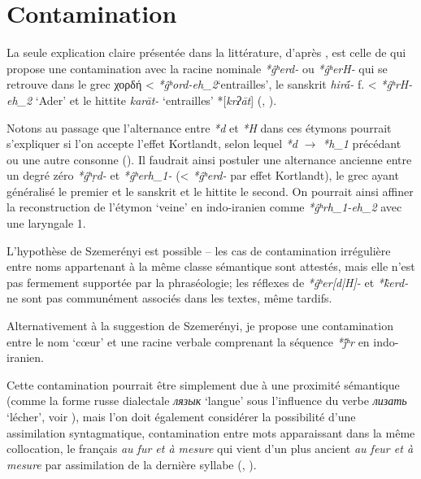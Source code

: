 \documentclass{article}
\newcommand{\ipa}[1]{{\phon\textit{#1}}}
\newcommand{\grec}[1]{{\mleccha #1}}
\begin{document}
 \section{Contamination}
La seule explication claire présentée dans la littérature, d'après \citet[420]{wodtko08NIL}, est celle de \citet{szemerenyi70heart} qui propose une contamination avec la racine nominale \ipa{*ĝʰerd-} ou \ipa{*ĝʰerH-} qui se retrouve dans le grec \grec{χορδή} < \ipa{*ĝʰord-eh_2}`entrailles', le sanskrit \ipa{hirā́-} f. < \ipa{*ĝʰrH-eh_2} `Ader' et le hittite \ipa{karāt-} `entrailles' *[\ipa{krʔāt}] (\citealt[208]{schrijver91laryngeals}, \citealt[446]{kloekhorst08edhil}).

Notons au passage que l'alternance entre \ipa{*d} et \ipa{*H} dans ces étymons pourrait s'expliquer si l'on accepte l'effet Kortlandt, selon lequel \ipa{*d} $\rightarrow$ \ipa{*h_1} précédant ou une autre consonne (\citealt{kortlandt83numerals, garnier14kortlandt}). Il faudrait ainsi postuler une alternance ancienne entre un degré zéro \ipa{*ĝʰṛd-} et  \ipa{*ĝʰerh_1-} (< \ipa{*ĝʰerd-} par effet Kortlandt), le grec ayant généralisé le premier et le sanskrit et le hittite le second. On pourrait ainsi affiner la reconstruction de l'étymon `veine' en indo-iranien comme \ipa{*ĝʰrh_1-eh_2} avec une laryngale 1.

L'hypothèse de Szemerényi est possible -- les cas de contamination irrégulière entre noms appartenant à la même classe sémantique sont attestés, mais elle n'est pas fermement supportée par la phraséologie; les réflexes de \ipa{*ĝʰer[d|H]-} et \ipa{*k̂erd-} ne sont pas communément associés dans les textes, même tardifs.

Alternativement à la suggestion de Szemerényi, je propose une contamination entre le nom `cœur' et une racine verbale comprenant la séquence \ipa{*j́ʰr} en indo-iranien. 

Cette contamination pourrait être simplement due à une proximité sémantique (comme la forme russe dialectale \ipa{лязык} `langue' sous l'influence du verbe \ipa{лизать} `lécher', voir \citealt[III, 485]{vasmer55russisches}), mais l'on doit également considérer la possibilité d'une assimilation syntagmatique, contamination entre mots apparaissant dans la même collocation, le français \ipa{au fur et à mesure} qui vient d'un plus ancient \ipa{au feur et à mesure} par assimilation de la dernière syllabe (\citealt[16]{andersen80morpho}, \citealt[64]{fertig13analogy}). %
\end{document}

